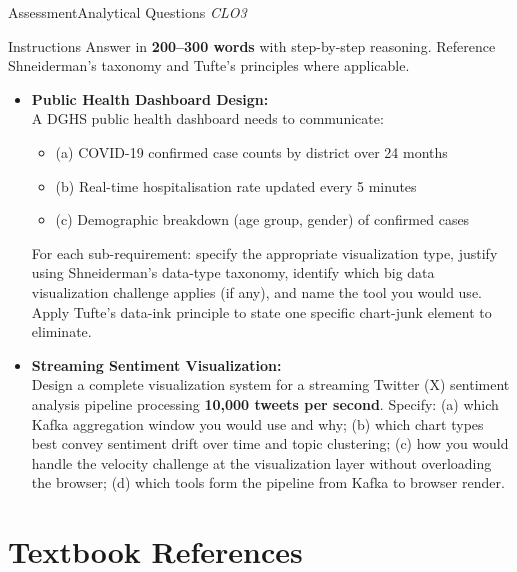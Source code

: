 \documentclass[aspectratio=169,10pt]{beamer}
\begin{document}
\begin{frame}{Assessment\textemdash Analytical Questions \hfill\small\textit{CLO3}}
  \begin{block}{Instructions}
    Answer in \textbf{200--300 words} with step-by-step reasoning.  Reference Shneiderman's taxonomy and Tufte's principles where applicable.
  \end{block}
  \vspace{6pt}
  \begin{itemize}
    \item[\textbf{A1.}] \textbf{Public Health Dashboard Design:}\\
    A DGHS public health dashboard needs to communicate:
    \begin{itemize}
      \item (a) COVID-19 confirmed case counts by district over 24 months
      \item (b) Real-time hospitalisation rate updated every 5 minutes
      \item (c) Demographic breakdown (age group, gender) of confirmed cases
    \end{itemize}
    For each sub-requirement: specify the appropriate visualization type, justify using Shneiderman's data-type taxonomy, identify which big data visualization challenge applies (if any), and name the tool you would use.  Apply Tufte's data-ink principle to state one specific chart-junk element to eliminate.
  \end{itemize}
  \vspace{6pt}
  \begin{itemize}
    \item[\textbf{A2.}] \textbf{Streaming Sentiment Visualization:}\\
    Design a complete visualization system for a streaming Twitter (X) sentiment analysis pipeline processing \textbf{10{,}000 tweets per second}.  Specify: (a) which Kafka aggregation window you would use and why; (b) which chart types best convey sentiment drift over time and topic clustering; (c) how you would handle the velocity challenge at the visualization layer without overloading the browser; (d) which tools form the pipeline from Kafka to browser render.
  \end{itemize}
\end{frame}

\section*{Textbook References}
\end{document}
